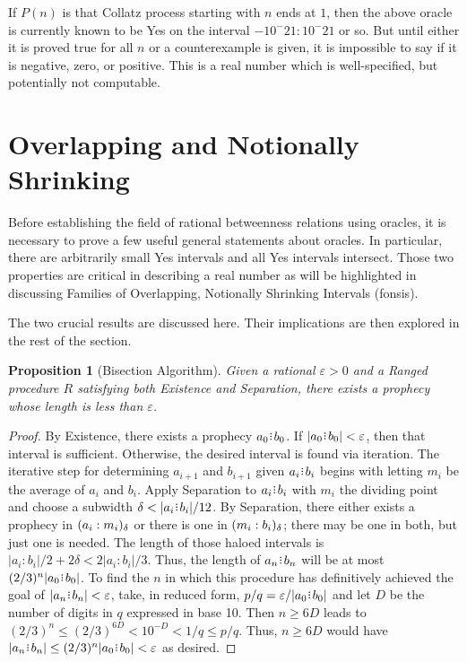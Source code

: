 \documentclass[12pt]{article}
\newtheorem{proposition}{Proposition}[section]
\begin{document}
If $P(n)$ is that Collatz process starting with $n$ ends at $1$, then the above oracle is currently known to be Yes on the interval $-10^-21:10^-21$ or so. But until either it is proved true for all $n$ or a counterexample is given, it is impossible to say if it is negative, zero, or positive. This is a real number which is well-specified, but potentially not computable. 


\section{Overlapping and Notionally Shrinking}

Before establishing the field of rational betweenness relations using oracles, it is necessary to prove a few useful general statements about oracles. In particular, there are arbitrarily small Yes intervals and all Yes intervals intersect. Those two properties are critical in describing a real number as will be highlighted in discussing Families of Overlapping, Notionally Shrinking Intervals (fonsis). 

The two crucial results are discussed here. Their implications are then explored in the rest of the section. 

\begin{proposition}[Bisection Algorithm]
    Given a rational $\varepsilon >0$ and a Ranged procedure $R$ satisfying both Existence and Separation, there exists a prophecy whose length is less than $\varepsilon$.
\end{proposition}

\begin{proof}
    By Existence, there exists a prophecy $a_0\rint b_0$. If $|a_0\rint b_0| < \varepsilon$, then that interval is sufficient. Otherwise, the desired interval is found via iteration. The iterative step for determining $a_{i+1}$ and $b_{i+1}$ given $a_i\rint b_i$ begins with letting $m_i$ be the average of $a_i$ and $b_i$. Apply Separation to $a_i\rint b_i$ with $m_i$ the dividing point and choose a subwidth $\delta < |a_i\rint b_i|/12$. By Separation, there either exists a prophecy in $(a_i:m_i)_{\delta}$ or there is one in $(m_i:b_i)_{\delta}$; there may be one in both, but just one is needed. The length of those haloed intervals is $|a_i : b_i|/2 + 2 \delta < 2 |a_i:b_i| /3$. Thus, the length of $a_n\rint b_n$ will be at most $(2/3)^n |a_0\rint b_0|$. To find the $n$ in which this procedure has definitively achieved the goal of $|a_n\rint b_n|<\varepsilon$,  take, in reduced form, $p/q = \varepsilon/|a_0\rint b_0|$ and let $D$ be the number of digits in $q$ expressed in base 10. Then $n \geq  6D$ leads to  $(2/3)^n \leq (2/3)^{6D} < 10^{-D} < 1/q \leq p/q$. Thus, $n \geq 6D$ would have $|a_n\rint b_n| \leq (2/3)^n |a_0\rint b_0| < \varepsilon$ as desired. 
\end{proof}
\end{document}
